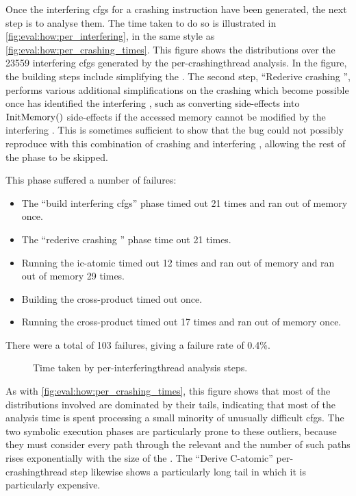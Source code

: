 Once the interfering \glspl{cfg} for a crashing instruction have been
generated, the next step is to analyse them.  The time taken to do so
is illustrated in \autoref{fig:eval:how:per_interfering}, in the same
style as \autoref{fig:eval:how:per_crashing_times}.  This figure shows
the distributions over the 23559 interfering \glspl{cfg} generated by
the per-\gls{crashingthread} analysis.  In the figure, the
{\StateMachine} building steps include simplifying the
{\StateMachines}.  The second step, ``Rederive crashing
{\StateMachine}'', performs various additional simplifications on the
crashing {\StateMachine} which become possible once {\technique} has
identified the interfering {\StateMachine}, such as converting
\stLoad{}{} side-effects into $\mathrm{InitMemory}()$ side-effects if the accessed
memory cannot be modified by the interfering {\StateMachine}.  This is
sometimes sufficient to show that the bug could not possibly reproduce
with this combination of crashing and interfering {\StateMachines},
allowing the rest of the phase to be skipped.  

This phase suffered a number of failures:
\begin{itemize}
\item The ``build interfering \glspl{cfg}'' phase timed out 21 times
  and ran out of memory once.
\item The ``rederive crashing {\StateMachine}'' phase time out 21
  times.
\item Running the \gls{ic-atomic} {\StateMachine} timed out 12 times
  and ran out of memory and ran out of memory 29 times.
\item Building the cross-product {\StateMachine} timed out once.
\item Running the cross-product {\StateMachine} timed out 17 times and
  ran out of memory once.
\end{itemize}
There were a total of 103 failures, giving a failure rate of 0.4\%.

\begin{figure}
  \centerline{
  }
  \caption{Time taken by per-\gls{interferingthread} analysis steps.}
\end{figure}

As with \autoref{fig:eval:how:per_crashing_times}, this figure shows
that most of the distributions involved are dominated by their tails,
indicating that most of the analysis time is spent processing a small
minority of unusually difficult \glspl{cfg}.  The two symbolic
execution phases are particularly prone to these outliers, because
they must consider every path through the relevant {\StateMachine} and
the number of such paths rises exponentially with the size of the
{\StateMachine}.  The ``Derive C-atomic'' per-\gls{crashingthread}
step likewise shows a particularly long tail in which it is
particularly expensive.


